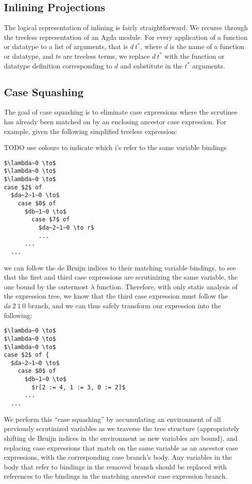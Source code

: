 \subsection{Inlining Projections}

The logical representation of inlining is fairly straightforward. We recurse through the treeless representation of an Agda module. For every application of a function or datatype to a list of arguments, that is $d~t^*$, where $d$ is the name of a function or datatype, and $t$s are treeless terms, we replace $d~t^*$ with the function or datatype definition corresponding to $d$ and substitute in the $t^*$ arguments.

\subsection{Case Squashing}

The goal of case squashing is to eliminate case expressions where the scrutinee has already been matched on by an enclosing ancestor case expression. For example, given the following simplified treeless expression:

TODO use colours to indicate which i's refer to the same variable bindings

\begin{lstlisting}[style=math]
$\lambda~0 \to$
$\lambda~0 \to$
$\lambda~0 \to$
case $2$ of
  $da~2~1~0 \to$
    case $0$ of
      $db~1~0 \to$
        case $7$ of
          $da~2~1~0 \to r$
          ...
      ...
  ...
\end{lstlisting}

we can follow the de Bruijn indices to their matching variable bindings, to see that the first and third case expressions are scrutinizing the same variable, the one bound by the outermost $\lambda$ function. Therefore, with only static analysis of the expression tree, we know that the third case expression must follow the $da~2~1~0$ branch, and we can thus safely transform our expression into the following:

\begin{lstlisting}[style=math]
$\lambda~0 \to$
$\lambda~0 \to$
$\lambda~0 \to$
case $2$ of {
  $da~2~1~0 \to$
    case $0$ of
      $db~1~0 \to$
        $r[2 := 4, 1 := 3, 0 := 2]$
      ...
  ...
\end{lstlisting}

We perform this ``case squashing'' by accumulating an environment of all previously scrutinized variables as we traverse the tree structure (appropriately shifting de Bruijn indices in the environment as new variables are bound), and replacing case expressions that match on the same variable as an ancestor case expressions, with the corresponding case branch's body. Any variables in the body that refer to bindings in the removed branch should be replaced with references to the bindings in the matching ancestor case expression branch.

